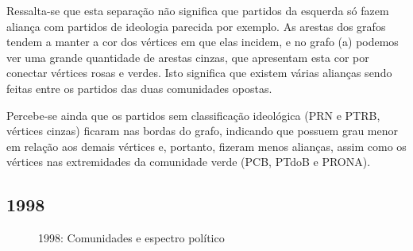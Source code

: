 Ressalta-se que esta separação não significa que partidos da esquerda só fazem aliança com partidos de ideologia parecida por exemplo. As arestas dos grafos tendem a manter a cor dos vértices em que elas incidem, e no grafo (a) podemos ver uma grande quantidade de arestas cinzas, que apresentam esta cor por conectar vértices rosas e verdes. Isto significa que existem várias alianças sendo feitas entre os partidos das duas comunidades opostas.

Percebe-se ainda que os partidos sem classificação ideológica (\gls{PRN} e \gls{PTRB}, vértices cinzas) ficaram nas bordas do grafo, indicando que possuem grau menor em relação aos demais vértices e, portanto, fizeram menos alianças, assim como os vértices nas extremidades da comunidade verde (\gls{PCB}, \gls{PTdoB} e \gls{PRONA}).


\subsection{1998}
\label{resultados__grafos--1998}

\begin{figure}[H]
\center
    \qquad

    \caption{1998: Comunidades e espectro político}
\end{figure}

